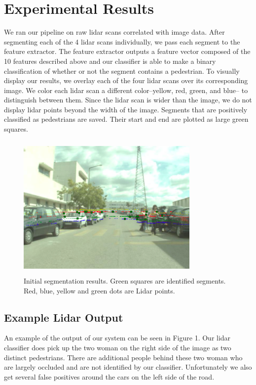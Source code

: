 \documentclass[10pt,twocolumn,letterpaper]{article}
\begin{document}
\section{Experimental Results}
  We ran our pipeline on raw lidar scans correlated with image data. After
  segmenting each of the 4 lidar scans individually, we pass each segment to the
  feature extractor. The feature extractor outputs a feature vector composed of
  the 10 features described above and our classifier is able to make a binary
  classification of whether or not the segment contains a pedestrian. To visually
  display our results, we overlay each of the four lidar scans over its corresponding
  image. We color each lidar scan a different color--yellow, red, green, and blue--
  to distinguish between them. Since the lidar scan is wider than the image,
  we do not display lidar points beyond the width of the image. Segments that are
  positively classified as pedestrians are saved. Their start and end are plotted
  as large green squares.

  \begin{figure}
    \includegraphics[height=2.8in, width=3.5in]{images/initial_result.png}
    \caption{ Initial segmentation results. Green squares are identified
    segments. Red, blue, yellow and green dots are Lidar points.}
  \end{figure}

  \subsection{Example Lidar Output}
  An example of the output of our system can be seen in Figure 1. Our lidar
  classifier does pick up the two woman on the right side of the image as two
  distinct pedestrians. There are additional people behind these two woman
  who are largely occluded and are not identified by our classifier. Unfortunately
  we also get several false positives around the cars on the left side of the road.
\end{document}
